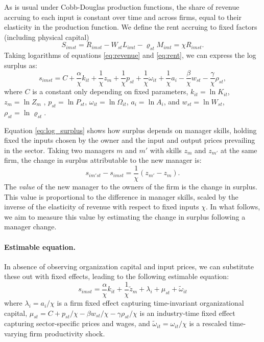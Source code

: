 \documentclass[11pt,a4paper]{article}
\begin{document}
As is usual under Cobb-Douglas production functions, the share of revenue accruing to each input is constant over time and across firms, equal to their elasticity in the production function. We define the rent accruing to fixed factors (including physical capital) 
\begin{equation}\label{eq:rent}
S_{imst} = R_{imst} - W_{st}L_{imt} - \varrho_{st}M_{imt} = \chi R_{imst}.
\end{equation}
Taking logarithms of equations \eqref{eq:revenue} and \eqref{eq:rent}, we can express the log surplus as:      
\begin{equation}\label{eq:log_surplus}
s_{imst} = C+\frac\alpha\chi k_{it} + \frac1\chi {z}_{m} + \frac1\chi p_{st} + \frac1\chi{\omega}_{it}+\frac1\chi a_i 
- \frac\beta\chi w_{st} - \frac\gamma\chi \rho_{st},
\end{equation}
where $C$ is a constant only depending on fixed parameters, $k_{it} = \ln K_{it}$, ${z}_{m} = \ln Z_m$ , $ p_{st} = \ln P_{st}$, ${\omega}_{it} = \ln\Omega_{it}$, $a_i = \ln A_i$, and $w_{st} = \ln W_{st}$, $\rho_{st} = \ln \varrho_{st}$. 

Equation \eqref{eq:log_surplus} shows how surplus depends on manager skills, holding fixed the inputs chosen by the owner and the input and output prices prevailing in the sector. Taking two managers $m$ and $m'$ with skills ${z}_m$ and ${z}_{m'}$ at the same firm, the change in surplus attributable to the new manager is:
\begin{equation}\label{eq:manager_change}
s_{im'st} - s_{imst} = \frac1\chi({z}_{m'} - {z}_{m}).
\end{equation}
The \emph{value} of the new manager to the owners of the firm is the change in surplus. This value is proportional to the difference in manager skills, scaled by the inverse of the elasticity of revenue with respect to fixed inputs $\chi$. In what follows, we aim to measure this value by estimating the change in surplus following a manager change.

\paragraph{Estimable equation.} In absence of observing organization capital and input prices, we can substitute these out with fixed effects, leading to the following estimable equation:
\begin{equation}\label{eq:estimation}
s_{imst} = \frac\alpha\chi k_{it}  + \frac1\chi\tilde{z}_m + \lambda_i + \mu_{st} + \tilde \omega_{it}
\end{equation}
where $\lambda_i = a_i/\chi$ is a firm fixed effect capturing time-invariant organizational capital, $\mu_{st} = C + p_{st}/\chi - \beta w_{st}/\chi - \gamma\rho_{st}/\chi$ is an industry-time fixed effect capturing sector-specific prices and wages, and $\tilde\omega_{it} = \omega_{it}/\chi$ is a rescaled time-varying firm productivity shock. 
\end{document}
